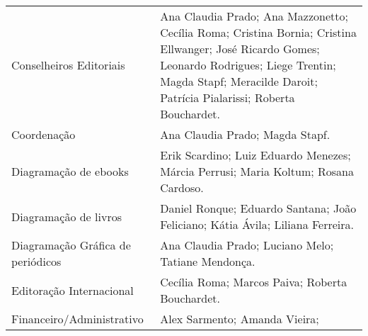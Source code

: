 \begin{longtable}[]{@{}
  >{\raggedright\arraybackslash}p{}
  >{\raggedright\arraybackslash}p{}@{}}
\begin{minipage}[b]{\linewidth}
Conselheiros Editoriais
\end{minipage} & \begin{minipage}[b]{\linewidth}\raggedright
Ana Claudia Prado; Ana Mazzonetto; Cecília Roma; Cristina Bornia; Cristina Ellwanger; José Ricardo Gomes; Leonardo Rodrigues; Liege Trentin; Magda Stapf; Meracilde Daroit; Patrícia Pialarissi; Roberta Bouchardet.
\end{minipage} \\
\begin{minipage}[b]{\linewidth}\raggedright
Coordenação
\end{minipage} & \begin{minipage}[b]{\linewidth}\raggedright
Ana Claudia Prado; Magda Stapf.
\end{minipage} \\
\begin{minipage}[b]{\linewidth}\raggedright
Diagramação de ebooks
\end{minipage} & \begin{minipage}[b]{\linewidth}\raggedright
Erik Scardino; Luiz Eduardo Menezes; Márcia Perrusi; Maria Koltum; Rosana Cardoso.
\end{minipage} \\
\begin{minipage}[b]{\linewidth}\raggedright
Diagramação de livros
\end{minipage} & \begin{minipage}[b]{\linewidth}\raggedright
Daniel Ronque; Eduardo Santana; João Feliciano; Kátia Ávila; Liliana Ferreira.
\end{minipage} \\
\begin{minipage}[b]{\linewidth}\raggedright
Diagramação Gráfica de periódicos
\end{minipage} & \begin{minipage}[b]{\linewidth}\raggedright
Ana Claudia Prado; Luciano Melo; Tatiane Mendonça.
\end{minipage} \\
\begin{minipage}[b]{\linewidth}\raggedright
Editoração Internacional
\end{minipage} & \begin{minipage}[b]{\linewidth}\raggedright
Cecília Roma; Marcos Paiva; Roberta Bouchardet.
\end{minipage} \\
\begin{minipage}[b]{\linewidth}\raggedright
Financeiro/Administrativo
\end{minipage} & \begin{minipage}[b]{\linewidth}\raggedright
Alex Sarmento; Amanda Vieira;


\end{minipage}
\end{longtable}
